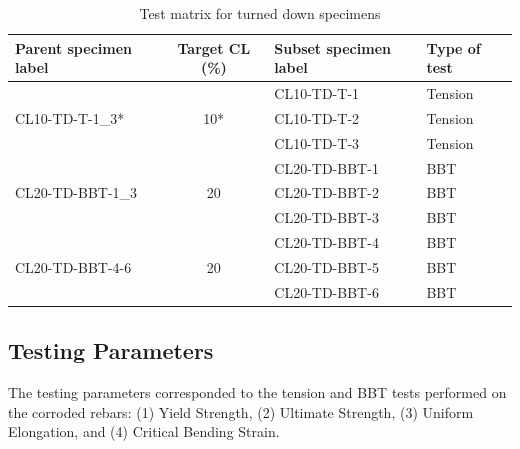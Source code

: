 \begin{table}[htbp]
\caption{Test matrix for turned down specimens}
\label{tab:turned_down_matrix}
\centering
\begin{tabular}{lcll}
Parent specimen label             & Target CL (\%)       & Subset specimen label & Type of test \\ \hline
\multirow{3}{*}{CL10-TD-T-1\_3*}  & \multirow{3}{*}{10*} & CL10-TD-T-1           & Tension      \\
                                  &                      & CL10-TD-T-2           & Tension      \\
                                  &                      & CL10-TD-T-3           & Tension      \\
\multirow{3}{*}{CL20-TD-BBT-1\_3} & \multirow{3}{*}{20}  & CL20-TD-BBT-1         & BBT          \\
                                  &                      & CL20-TD-BBT-2         & BBT          \\
                                  &                      & CL20-TD-BBT-3         & BBT          \\
\multirow{3}{*}{CL20-TD-BBT-4-6}  & \multirow{3}{*}{20}  & CL20-TD-BBT-4         & BBT          \\
                                  &                      & CL20-TD-BBT-5         & BBT          \\
                                  &                      & CL20-TD-BBT-6         & BBT         
\end{tabular}
\end{table}

\subsection{Testing Parameters}
The testing parameters corresponded to the tension and BBT tests performed on the corroded rebars: (1) Yield Strength, (2) Ultimate Strength, (3) Uniform Elongation, and (4) Critical Bending Strain.